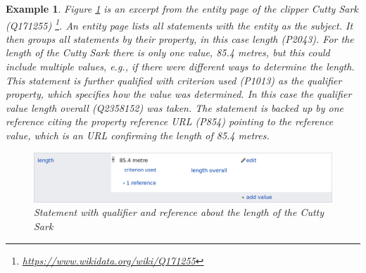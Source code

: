 \documentclass[hyperref,bachelorofscience,fleqn]{cgvpub}
\newtheorem{example}{Example}
\begin{document}
\begin{example}
Figure \ref{fig_example} is an excerpt from the entity page of the clipper \emph{Cutty Sark} (Q171255) \footnote{\url{https://www.wikidata.org/wiki/Q171255}}. An entity page lists all statements with the entity as the subject. It then groups all statements by their property, in this case \emph{length} (P2043). For the length of the Cutty Sark there is only one value, 85.4 metres, but this could include multiple values, e.g., if there were different ways to determine the length. This statement is further qualified with \emph{criterion used} (P1013) as the qualifier property, which specifies how the value was determined. In this case the qualifier value \emph{length overall} (Q2358152) was taken. The statement is backed up by one reference citing the property \emph{reference URL} (P854) pointing to the reference value, which is an URL confirming the length of 85.4 metres.

\begin{figure}[H]
\includegraphics[width=\linewidth]{images/cutty_sark_length.png}
\caption{Statement with qualifier and reference about the length of the Cutty Sark}\label{fig_example}
\end{figure}
\end{example}
\end{document}

